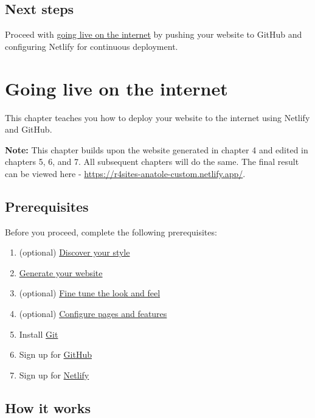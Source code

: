 \documentclass[
]{book}
\providecommand{\tightlist}{%
  \setlength{\itemsep}{0pt}\setlength{\parskip}{0pt}}
\begin{document}
\hypertarget{next-steps-5}{%
\section{Next steps}\label{next-steps-5}}

Proceed with \protect\hyperlink{deploy}{going live on the internet} by pushing your website to GitHub and configuring Netlify for continuous deployment.

\hypertarget{deploy}{%
\chapter{Going live on the internet}\label{deploy}}

This chapter teaches you how to deploy your website to the internet using Netlify and GitHub.

\textbf{Note:} This chapter builds upon the website generated in chapter 4 and edited in chapters 5, 6, and 7. All subsequent chapters will do the same. The final result can be viewed here - \url{https://r4sites-anatole-custom.netlify.app/}.

\hypertarget{prerequisites-4}{%
\section{Prerequisites}\label{prerequisites-4}}

Before you proceed, complete the following prerequisites:

\begin{enumerate}
\def\labelenumi{\arabic{enumi}.}
\tightlist
\item
  (optional) \protect\hyperlink{choose-theme}{Discover your style}
\item
  \protect\hyperlink{generate}{Generate your website}
\item
  (optional) \protect\hyperlink{fine-tune}{Fine tune the look and feel}
\item
  (optional) \protect\hyperlink{pages-features}{Configure pages and features}
\item
  Install \href{https://git-scm.com/book/en/v2/Getting-Started-Installing-Git}{Git}
\item
  Sign up for \href{https://github.com/}{GitHub}
\item
  Sign up for \href{https://app.netlify.com/}{Netlify}
\end{enumerate}

\hypertarget{how-it-works-4}{%
\section{How it works}\label{how-it-works-4}}
\end{document}
